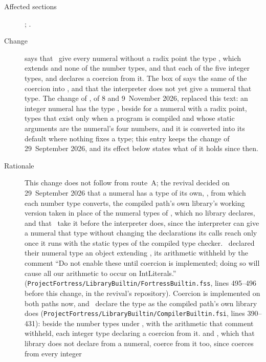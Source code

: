 \begin{description}
\item[Affected sections] ; .
\item[Change]  says that \library\ give every numeral without a
radix point the type , which extends  and none of the
number types, and that each of the five integer types,  and
 declares a coercion from it.
The box of  says the same of the coercion into
, and that the interpreter does not yet give a numeral that
type.
The change of , of 8 and 9~November 2026, replaced
this text: an integer numeral has the type
, beside
 for a numeral with a
radix point, types that exist only when a program is compiled and whose static
arguments are the numeral's four numbers, and it is converted into its default
where nothing fixes a type; this entry keeps the change of 29~September 2026,
and its effect below states what of it holds since then.
\item[Rationale] This change does not follow from route~A; the revival decided
on 29~September 2026 that a numeral has a type of its own, ,
from which each number type converts, the compiled path's own library's working
version taken in place of the numeral types of , which no
library declares, and that \library\ take it before the interpreter does, since
the interpreter can give a numeral that type without changing the declarations
its calls reach only once it runs with the static types of the compiled type
checker.
\Library\ declared their numeral type an object extending ,
its arithmetic withheld by the comment ``Do not enable these until coercion is
implemented; doing so will cause all our arithmetic to occur on IntLiterals.''
(\nolinkurl{ProjectFortress/LibraryBuiltin/FortressBuiltin.fss}, lines
495--496 before this change, in the revival's repository).
Coercion is implemented on both paths now, and \library\ declare the type as
the compiled path's own library does
(\nolinkurl{ProjectFortress/LibraryBuiltin/CompilerBuiltin.fsi}, lines
390--431): beside the number types under , with the arithmetic that
comment withheld, each integer type declaring a coercion from it.
 and , which that library does not declare from
a numeral, coerce from it too, since  coerces from every integer

\end{description}
